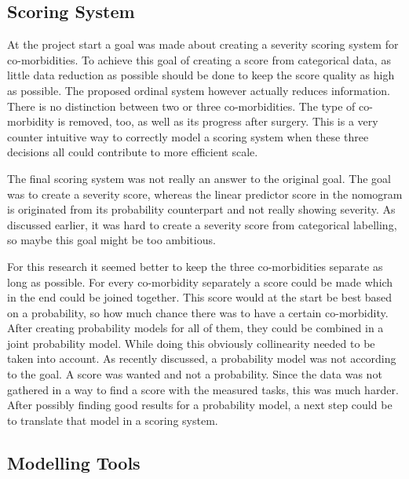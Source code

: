 \documentclass[10pt,a4paper]{article}
\begin{document}
	\subsection{Scoring System}
	
	At the project start a goal was made about creating a severity scoring system for co-morbidities. To achieve this goal of creating a score from categorical data, as little data reduction as possible should be done to keep the score quality as high as possible. The proposed ordinal system however actually reduces information. There is no distinction between two or three co-morbidities. The type of co-morbidity is removed, too, as well as its progress after surgery. This is a very counter intuitive way to correctly model a scoring system when these three decisions all could contribute to more efficient scale.
	
	The final scoring system was not really an answer to the original goal. The goal was to create a severity score, whereas the linear predictor score in the nomogram is originated from its probability counterpart and not really showing severity. As discussed earlier, it was hard to create a severity score from categorical labelling, so maybe this goal might be too ambitious. %
	
	For this research it seemed better to keep the three co-morbidities separate as long as possible. For every co-morbidity separately a score could be made which in the end could be joined together. This score would at the start be best based on a probability, so how much chance there was to have a certain co-morbidity. After creating probability models for all of them, they could be combined in a joint probability model. While doing this obviously collinearity needed to be taken into account. As recently discussed, a probability model was not according to the goal. A score was wanted and not a probability. Since the data was not gathered in a way to find a score with the measured tasks, this was much harder. After possibly finding good results for a probability model, a next step could be to translate that model in a scoring system.
	
	\subsection{Modelling Tools}
\end{document}

